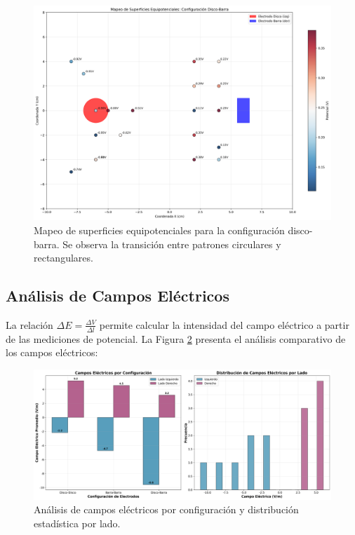 \documentclass[11pt,twocolumn]{article}
\begin{document}
\begin{figure}[h]
\centering
\includegraphics[width=0.9\columnwidth]{graficas/mapeo_disco_barra.png}
\caption{Mapeo de superficies equipotenciales para la configuración disco-barra. Se observa la transición entre patrones circulares y rectangulares.}
\label{fig:mapeo_disco_barra}
\end{figure}

\subsection{Análisis de Campos Eléctricos}

La relación $\Delta E = \frac{\Delta V}{\Delta l}$ permite calcular la intensidad del campo eléctrico a partir de las mediciones de potencial. La Figura \ref{fig:campos_electricos} presenta el análisis comparativo de los campos eléctricos:

\begin{figure}[h]
\centering
\includegraphics[width=0.9\columnwidth]{graficas/analisis_campos_electricos.png}
\caption{Análisis de campos eléctricos por configuración y distribución estadística por lado.}
\label{fig:campos_electricos}
\end{figure}
\end{document}
